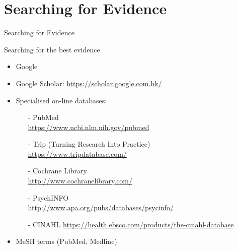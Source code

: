 \documentclass{beamer}
\begin{document}
\section*{Searching for Evidence}

\begin{frame}
\begin{center}
\Huge{Searching for Evidence}
\end{center}
\end{frame}

\begin{frame} {Searching for the best evidence}
	\begin{itemize}
	\item Google
	\item Google Scholar: \url{https://scholar.google.com.hk/}
	\item Specialised on-line databases: 
		\begin{itemize}
		\item[-] PubMed \\ \url{https://www.ncbi.nlm.nih.gov/pubmed}
		\item[-] Trip (Turning Research Into Practice) \\ \url{https://www.tripdatabase.com/}
		\item[-] Cochrane Library \\ \url{http://www.cochranelibrary.com/}
		\item[-] PsychINFO \\ \url{http://www.apa.org/pubs/databases/psycinfo/} 
		\item[-] CINAHL \url{https://health.ebsco.com/products/the-cinahl-database}
		\end{itemize}
	\item MeSH terms (PubMed, Medline)
	\end{itemize}
\end{frame}

\end{document}
